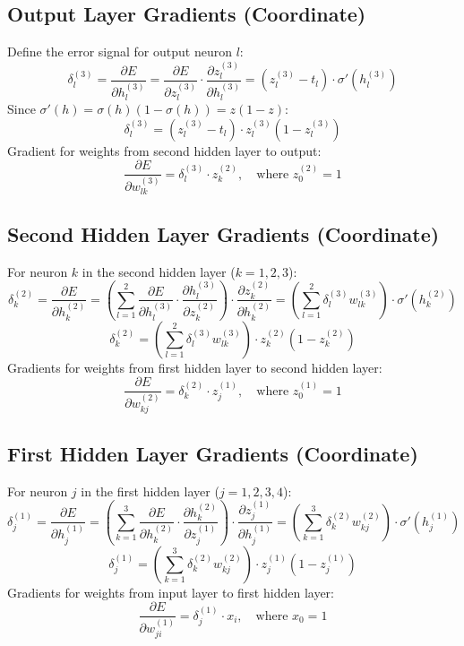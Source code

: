\documentclass{tufte-handout}
\begin{document}
\subsection{Output Layer Gradients (Coordinate)}
Define the error signal for output neuron $l$:
\[
\delta^{(3)}_l = \frac{\partial E}{\partial h^{(3)}_l} = \frac{\partial E}{\partial z^{(3)}_l} \cdot \frac{\partial z^{(3)}_l}{\partial h^{(3)}_l} = \left( z^{(3)}_l - t_l \right) \cdot \sigma'(h^{(3)}_l)
\]
Since $\sigma'(h) = \sigma(h)(1-\sigma(h)) = z(1-z)$:
\[
\delta^{(3)}_l = (z^{(3)}_l - t_l) \cdot z^{(3)}_l (1 - z^{(3)}_l)
\]
Gradient for weights from second hidden layer to output:
\[
\frac{\partial E}{\partial w^{(3)}_{lk}} = \delta^{(3)}_l \cdot z^{(2)}_k, \quad \text{where } z^{(2)}_0 = 1
\]

\subsection{Second Hidden Layer Gradients (Coordinate)}
For neuron $k$ in the second hidden layer ($k=1,2,3$):
\[
\delta^{(2)}_k = \frac{\partial E}{\partial h^{(2)}_k} = \left( \sum_{l=1}^{2} \frac{\partial E}{\partial h^{(3)}_l} \cdot \frac{\partial h^{(3)}_l}{\partial z^{(2)}_k} \right) \cdot \frac{\partial z^{(2)}_k}{\partial h^{(2)}_k} = \left( \sum_{l=1}^{2} \delta^{(3)}_l w^{(3)}_{lk} \right) \cdot \sigma'(h^{(2)}_k)
\]
\[
\delta^{(2)}_k = \left( \sum_{l=1}^{2} \delta^{(3)}_l w^{(3)}_{lk} \right) \cdot z^{(2)}_k (1 - z^{(2)}_k)
\]
Gradients for weights from first hidden layer to second hidden layer:
\[
\frac{\partial E}{\partial w^{(2)}_{kj}} = \delta^{(2)}_k \cdot z^{(1)}_j, \quad \text{where } z^{(1)}_0 = 1
\]

\subsection{First Hidden Layer Gradients (Coordinate)}
For neuron $j$ in the first hidden layer ($j=1,2,3,4$):
\[
\delta^{(1)}_j = \frac{\partial E}{\partial h^{(1)}_j} = \left( \sum_{k=1}^{3} \frac{\partial E}{\partial h^{(2)}_k} \cdot \frac{\partial h^{(2)}_k}{\partial z^{(1)}_j} \right) \cdot \frac{\partial z^{(1)}_j}{\partial h^{(1)}_j} = \left( \sum_{k=1}^{3} \delta^{(2)}_k w^{(2)}_{kj} \right) \cdot \sigma'(h^{(1)}_j)
\]
\[
\delta^{(1)}_j = \left( \sum_{k=1}^{3} \delta^{(2)}_k w^{(2)}_{kj} \right) \cdot z^{(1)}_j (1 - z^{(1)}_j)
\]
Gradients for weights from input layer to first hidden layer:
\[
\frac{\partial E}{\partial w^{(1)}_{ji}} = \delta^{(1)}_j \cdot x_i, \quad \text{where } x_0 = 1
\]
\end{document}
